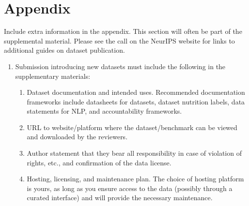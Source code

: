 \appendix

\section{Appendix}

Include extra information in the appendix. This section will often be part of the supplemental material. Please see the call on the NeurIPS website for links to additional guides on dataset publication.

\begin{enumerate}

\item Submission introducing new datasets must include the following in the supplementary materials:
\begin{enumerate}
  \item Dataset documentation and intended uses. Recommended documentation frameworks include datasheets for datasets, dataset nutrition labels, data statements for NLP, and accountability frameworks.
  \item URL to website/platform where the dataset/benchmark can be viewed and downloaded by the reviewers.
  \item Author statement that they bear all responsibility in case of violation of rights, etc., and confirmation of the data license.
  \item Hosting, licensing, and maintenance plan. The choice of hosting platform is yours, as long as you ensure access to the data (possibly through a curated interface) and will provide the necessary maintenance.
\end{enumerate}


\end{enumerate}
